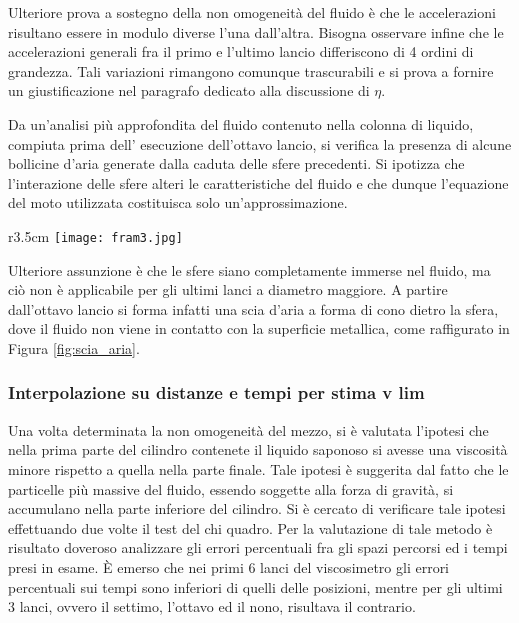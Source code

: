 \documentclass[a4paper,11pt,oneside]{article}
\begin{document}
Ulteriore prova a sostegno della non omogeneità del fluido è che le accelerazioni risultano essere in modulo diverse l'una dall'altra.
Bisogna osservare infine che le accelerazioni generali fra il primo e l'ultimo lancio differiscono di 4 ordini di grandezza. Tali variazioni rimangono comunque trascurabili e si prova a fornire un giustificazione nel paragrafo dedicato alla discussione di $\eta$.\newline



Da un'analisi più approfondita del fluido contenuto nella colonna di liquido, compiuta prima dell' esecuzione dell'ottavo lancio, si verifica la presenza di alcune bollicine d'aria generate dalla caduta delle sfere precedenti. Si ipotizza che l'interazione delle sfere alteri le caratteristiche del fluido e che dunque l'equazione del moto utilizzata costituisca solo un'approssimazione.
\begin{wrapfigure}{r}{3.5cm}
    \centering
    \texttt{[image: fram3.jpg]}
    \caption{Scia d'aria}
    \label{fig:scia_aria}
\end{wrapfigure}
 
Ulteriore assunzione è che le sfere siano completamente immerse nel fluido, ma ciò non è applicabile per gli ultimi lanci a diametro maggiore. A partire dall'ottavo lancio si forma infatti una scia d'aria a forma di cono dietro la sfera, dove il fluido non viene in contatto con la superficie metallica, come raffigurato in Figura \ref{fig:scia_aria}. \newline



\subsubsection*{Interpolazione su distanze e tempi per stima v lim}
Una volta determinata la non omogeneità del mezzo, si è valutata l'ipotesi che nella prima parte del cilindro contenete il liquido saponoso si avesse una viscosità minore rispetto a quella nella parte finale. Tale ipotesi è suggerita dal fatto che le particelle più massive del fluido, essendo soggette alla forza di gravità, si accumulano nella parte inferiore del cilindro.
Si è cercato di verificare tale ipotesi effettuando due volte il test del chi quadro.
Per la valutazione di tale metodo è risultato doveroso analizzare gli errori percentuali fra gli spazi percorsi ed i tempi presi in esame. È emerso che nei primi 6 lanci del viscosimetro gli errori percentuali sui tempi sono inferiori di quelli delle posizioni, mentre per gli ultimi 3 lanci, ovvero il settimo, l'ottavo ed il nono, risultava il contrario. 
\end{document}
